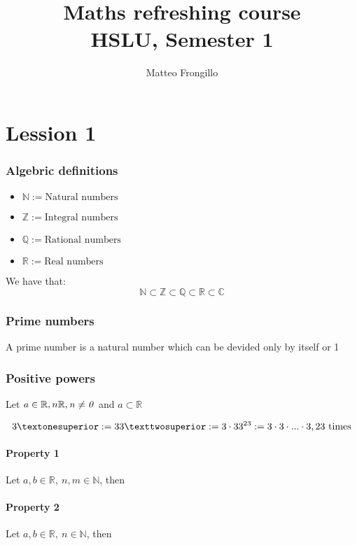 \documentclass{article}
\title{\textbf{Maths refreshing course \\ HSLU, Semester 1}}
\author{Matteo Frongillo}
\begin{document}
\maketitle
\tableofcontents
\pagebreak

\part{Lession 1}

\section{Algebric definitions}
\begin{itemize}
    \item $\mathbb{N} := \text{Natural numbers}$
    \item $\mathbb{Z} := \text{Integral numbers}$
    \item $\mathbb{Q} := \text{Rational numbers}$
    \item $\mathbb{R} := \text{Real numbers}$
\end{itemize}

We have that: 
\[
    \mathbb{N} \subset  \mathbb{Z} \subset \mathbb{Q} \subset \mathbb{R} \subset \mathbb{C} 
\]

\section{Prime numbers}
A prime number is a natural number which can be
devided only by itself or 1\\

\section{Positive powers}
Let $a \in \mathbb{R}, n \it \mathbb{R}, n \neq 0$
and ${a} \subset \mathbb{R}$

\[
    3¹ := 3 \\
    3² := 3 \cdot 3 \\
    3^{23} := 3 \cdot 3 \cdot ... \cdot 3, \text{23 times}
\]

\subsection{Property 1}
Let $a, b \in \mathbb{R},\ n,m \in \mathbb{N}$, then \\

\subsection{Property 2}
Let $a,b \in \mathbb{R},\ n \in \mathbb{N}$, then \\
\end{document}
